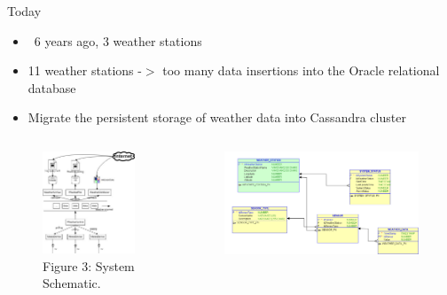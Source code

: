 \documentclass[12pt]{beamer}
\begin{document}
\begin{frame}{Today}
\begin{itemize}
\item ~6 years ago, 3 weather stations
\item 11 weather stations -$>$ too many data insertions into the Oracle relational database
\item Migrate the persistent storage of weather data into Cassandra cluster
\end{itemize}
\end{frame}

\begin{frame}
\begin{columns}
\begin{center}
\begin{figure}[Schematic]
\includegraphics[scale=0.4]{WeatherStation_esquemas.jpg} \vspace*{10pt}
\captionsize\tiny Figure 3: System Schematic.
\label{System Schematic}
\end{figure}
\end{center}
\begin{center}
\begin{figure}[DB]
\includegraphics[scale=0.15]{WeatherStation.png} \vspace*{10pt}

\end{figure}
\end{center}
\end{columns}
\end{frame}
\end{document}
